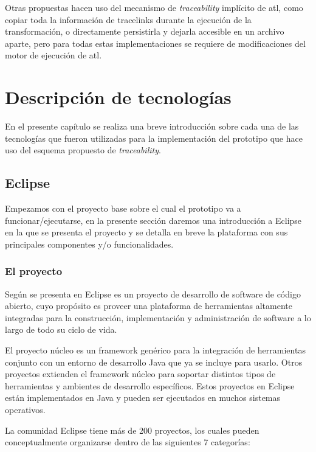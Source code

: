 \documentclass[a4paper,12pt,oneside,spanish]{book}
\begin{document}
Otras propuestas hacen uso del mecanismo de \textit{traceability} implícito de \gls{atl}, como copiar toda la información de tracelinks durante la ejecución de la transformación, o directamente persistirla y dejarla accesible en un archivo aparte, pero para todas estas implementaciones se requiere de modificaciones del motor de ejecución de \gls{atl}.



\chapter{Descripción de tecnologías}

En el presente capítulo se realiza una breve introducción sobre cada una de las tecnologías que fueron utilizadas para la implementación del prototipo que hace uso del esquema propuesto de \textit{traceability}.


\section{Eclipse}

Empezamos con el proyecto base sobre el cual el prototipo va a funcionar/ejecutarse, en la presente sección daremos una introducción a Eclipse en la que se presenta el proyecto y se detalla en breve la plataforma con sus principales componentes y/o funcionalidades.


\subsection{El proyecto}

Según se presenta en \cite{EMFADG, Eclipse} Eclipse es un proyecto de desarrollo de software de código abierto, cuyo propósito es proveer una plataforma de herramientas altamente integradas para la construcción, implementación y administración de software a lo largo de todo su ciclo de vida.

El proyecto núcleo es un framework genérico para la integración de herramientas conjunto con un entorno de desarrollo Java que ya se incluye para usarlo. Otros proyectos extienden el framework núcleo para soportar distintos tipos de herramientas y ambientes de desarrollo específicos. Estos proyectos en Eclipse están implementados en Java y pueden ser ejecutados en muchos sistemas operativos.

La comunidad Eclipse tiene más de 200 proyectos, los cuales pueden conceptualmente organizarse dentro de las siguientes 7 categorías:
\end{document}
